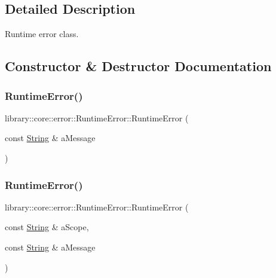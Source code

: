 \subsection{Detailed Description}
Runtime error class. 

\subsection{Constructor \& Destructor Documentation}
\mbox{\label{classlibrary_1_1core_1_1error_1_1RuntimeError_a6ba0ac577d200ad5f83843ecbe775c2f}} 
\subsubsection{\texorpdfstring{Runtime\+Error()}{RuntimeError()}\hspace{0.1cm}{\footnotesize\ttfamily [1/2]}}
{\footnotesize\ttfamily library\+::core\+::error\+::\+Runtime\+Error\+::\+Runtime\+Error (\begin{DoxyParamCaption}\item[{const \hyperlink{classlibrary_1_1core_1_1types_1_1String}{String} \&}]{a\+Message }\end{DoxyParamCaption})}

\mbox{\label{classlibrary_1_1core_1_1error_1_1RuntimeError_ac0e3fcfbbd3636c42dc6e64461e41d85}} 
\subsubsection{\texorpdfstring{Runtime\+Error()}{RuntimeError()}\hspace{0.1cm}{\footnotesize\ttfamily [2/2]}}
{\footnotesize\ttfamily library\+::core\+::error\+::\+Runtime\+Error\+::\+Runtime\+Error (\begin{DoxyParamCaption}\item[{const \hyperlink{classlibrary_1_1core_1_1types_1_1String}{String} \&}]{a\+Scope,  }\item[{const \hyperlink{classlibrary_1_1core_1_1types_1_1String}{String} \&}]{a\+Message }\end{DoxyParamCaption})}

